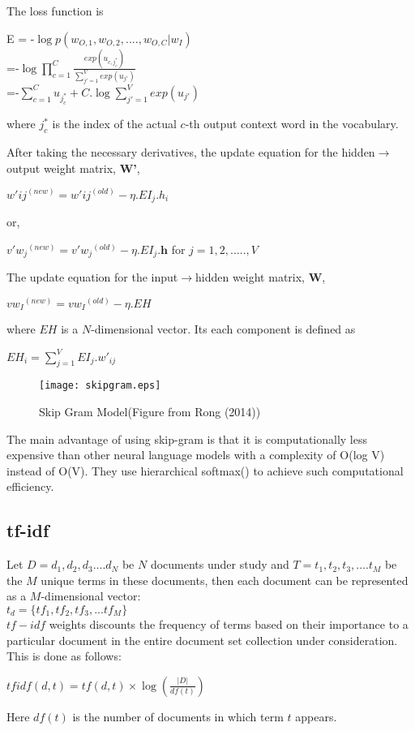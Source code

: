 The loss function is
\begin{center}
E = -$\log p(w_{O,1},w_{O,2},....,w_{O,C}|w_I)$\\
=-$\log \prod_{c=1}^{C}\frac{exp(u_{c,j_{c}^{*	}})}{\sum_{j'=1}^{V}exp(u_{j'})}$\\
=-$\sum_{c=1}^{C} u_{j_{c}^{*}}+C.\log \sum_{j'=1}^{V}exp(u_{j'})$
\end{center}
where $j_{c}^{*}$ is the index of the actual $c$-th output context word in the vocabulary.

After taking the necessary derivatives, the update equation for the hidden$\rightarrow$output weight matrix, \textbf{W'},
\begin{center}
$w'{ij}^{(new)}=w'{ij}^{(old)}-\eta .EI_j.h_i$
\end{center}
or,
\begin{center}
$v'{w_j}^{(new)}=v'{w_j}^{(old)}-\eta .EI_j.\textbf{h}$ for $j=1,2,.....,V$
\end{center}

The update equation for the input$\rightarrow$hidden weight matrix, \textbf{W},
\begin{center}
$v{w_I}^{(new)}=v{w_I}^{(old)}-\eta .EH$
\end{center}
where $EH$ is a $N$-dimensional vector. Its each component is defined as
\begin{center}
$EH_i=\sum_{j=1}^{V}EI_j.w'_{ij}$
\end{center}

\begin{figure}[ht!]
\centering
\texttt{[image: skipgram.eps]}
\caption{Skip Gram Model(Figure from Rong (2014)) \label{fig:skipgram}}
\end{figure}
The main advantage of using skip-gram is that it is computationally less expensive than other neural language models with a complexity of O(log V) instead of O(V). They use hierarchical softmax(\cite{Morin:05}) to achieve such computational efficiency.

\subsection{tf-idf}
\label{subsec:tfidf}
Let $D=d_1, d_2, d_3....d_N$ be $N$ documents under study and $T=t_1, t_2, t_3,....t_M$ be the $M$ unique terms in these documents, then each document can be represented as a $M$-dimensional vector:\\
$t_d=\{tf_1,tf_2,tf_3,...tf_M\}$\\
$tf-idf$ weights discounts the frequency of terms based on their importance to a particular document in the entire document set collection under consideration. This is done as follows:
\begin{center}
$tfidf(d,t)=tf(d,t) \times \log(\frac{|D|}{df(t)})$ 
\end{center}
Here $df(t)$ is the number of documents in which term $t$ appears.

